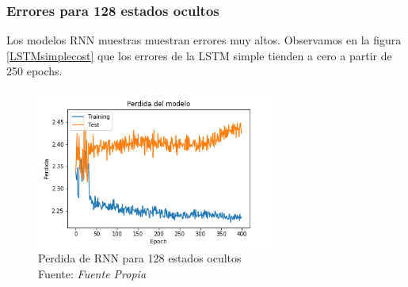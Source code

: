 \subsubsection{Errores para 128 estados ocultos}
Los modelos RNN muestras muestran errores muy altos. Observamos en la figura \ref{LSTMsimplecost} que los errores de la LSTM simple tienden a cero a partir de 250 epochs.
\begin{figure}[H]
	\centering
	\includegraphics[width=0.7\textwidth]{Figures/rnn_cost_400_13mfcc}
	\caption{Perdida de RNN para 128 estados ocultos\\ Fuente: {\textit{Fuente Propia}}}
	\label{RNNSIMPLEcost}
\end{figure} 


